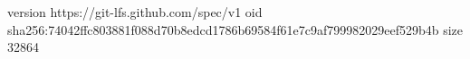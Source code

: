 version https://git-lfs.github.com/spec/v1
oid sha256:74042ffc803881f088d70b8edcd1786b69584f61e7c9af799982029eef529b4b
size 32864
